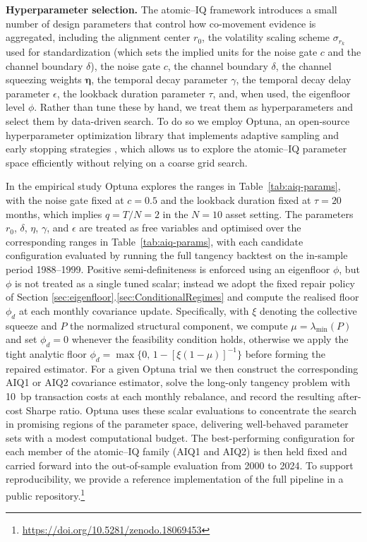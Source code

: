 \documentclass[12pt,letterpaper]{article}
\begin{document}
\noindent\textbf{Hyperparameter selection.} The atomic--IQ framework introduces a small number of design parameters that control how co-movement evidence is aggregated, including the alignment center \(r_0\), the volatility scaling scheme \(\sigma_{r_k}\) used for standardization (which sets the implied units for the noise gate \(c\) and the channel boundary \(\delta\)), the noise gate \(c\), the channel boundary \(\delta\), the channel squeezing weights $\boldsymbol{\eta}$, the temporal decay parameter \(\gamma\), the temporal decay delay parameter \(\epsilon\), the lookback duration parameter \(\tau\), and, when used, the eigenfloor level \(\phi\). Rather than tune these by hand, we treat them as hyperparameters and select them by data-driven search. To do so we employ Optuna, an open-source hyperparameter optimization library that implements adaptive sampling and early stopping strategies \citep{akiba2019optuna}, which allows us to explore the atomic--IQ parameter space efficiently without relying on a coarse grid search.

In the empirical study Optuna explores the ranges in Table~\ref{tab:aiq-params}, with the noise gate fixed at \(c = 0.5\) and the lookback duration fixed at \(\tau = 20\) months, which implies \(q = T/N = 2\) in the \(N=10\) asset setting. The parameters \(r_0\), \(\delta\), \(\eta\), \(\gamma\), and \(\epsilon\) are treated as free variables and optimised over the corresponding ranges in Table~\ref{tab:aiq-params}, with each candidate configuration evaluated by running the full tangency backtest on the in-sample period 1988--1999. Positive semi-definiteness is enforced using an eigenfloor \(\phi\), but \(\phi\) is not treated as a single tuned scalar; instead we adopt the fixed repair policy of Section \ref{sec:eigenfloor}.\ref{sec:ConditionalRegimes} and compute the realised floor \(\phi_d\) at each monthly covariance update. Specifically, with \(\xi\) denoting the collective squeeze and \(P\) the normalized structural component, we compute \(\mu = \lambda_{\min}(P)\) and set \(\phi_d = 0\) whenever the feasibility condition holds, otherwise we apply the tight analytic floor \(\phi_d = \max\{0,\, 1 - [\xi(1-\mu)]^{-1}\}\) before forming the repaired estimator. For a given Optuna trial we then construct the corresponding AIQ1 or AIQ2 covariance estimator, solve the long-only tangency problem with 10~bp transaction costs at each monthly rebalance, and record the resulting after-cost Sharpe ratio. Optuna uses these scalar evaluations to concentrate the search in promising regions of the parameter space, delivering well-behaved parameter sets with a modest computational budget. The best-performing configuration for each member of the atomic--IQ family (AIQ1 and AIQ2) is then held fixed and carried forward into the out-of-sample evaluation from 2000 to 2024. To support reproducibility, we provide a reference implementation of the full pipeline in a public repository.\footnote{\url{https://doi.org/10.5281/zenodo.18069453}}
\end{document}
